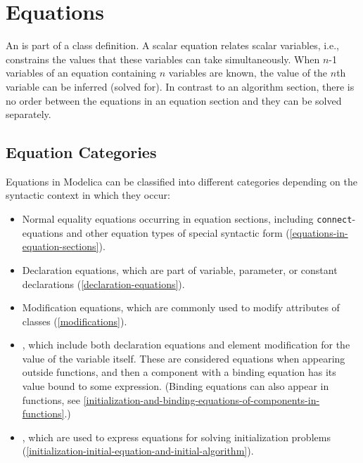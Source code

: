 \chapter{Equations}\label{equations}

An  is part of a class definition.
A scalar equation relates scalar variables, i.e., constrains the values that these variables can take simultaneously.
When $n$-1 variables of an equation containing $n$ variables are known, the value of the $n$th variable can be inferred (solved for).
In contrast to an algorithm section, there is no order between the equations in an equation section and they can be solved separately.

\section{Equation Categories}\label{equation-categories}

Equations in Modelica can be classified into different categories depending on the syntactic context in which they occur:
\begin{itemize}
\item
  Normal equality equations occurring in equation sections, including \lstinline!connect!-equations and other equation types of special syntactic form (\cref{equations-in-equation-sections}).
\item
  Declaration equations, which are part of variable, parameter, or constant declarations (\cref{declaration-equations}).
\item
  Modification equations, which are commonly used to modify attributes of classes (\cref{modifications}).
\item
  , which include both declaration equations and element modification for the value of the variable itself.
  These are considered equations when appearing outside functions, and then a component with a binding equation has its value bound to some expression.
  (Binding equations can also appear in functions, see \cref{initialization-and-binding-equations-of-components-in-functions}.)
\item
  , which are used to express equations for solving initialization problems (\cref{initialization-initial-equation-and-initial-algorithm}).
\end{itemize}


